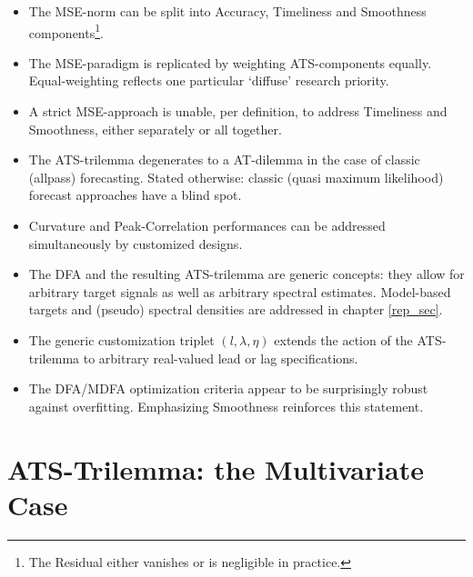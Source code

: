 \documentclass[a4paper]{book}
\begin{document}
\begin{itemize}
\item The MSE-norm can be split into Accuracy, Timeliness and Smoothness components\footnote{The Residual either vanishes or is negligible in practice.}. 
\item The MSE-paradigm is replicated by weighting ATS-components equally. Equal-weighting reflects one particular `diffuse' research priority.
\item A strict MSE-approach is unable, per definition, to address Timeliness and Smoothness, either separately or all together.
\item The ATS-trilemma degenerates to a AT-dilemma in the case of classic (allpass) forecasting. Stated otherwise: classic (quasi maximum likelihood) forecast approaches have a blind spot. 
\item Curvature and  Peak-Correlation performances can be addressed simultaneously by customized designs. 
\item The DFA and the resulting ATS-trilemma are generic concepts: they allow for arbitrary target signals as well as arbitrary spectral estimates. Model-based targets and (pseudo) spectral densities are addressed in chapter \ref{rep_sec}.
\item The generic customization triplet $(l,\lambda,\eta)$ extends the action of the ATS-trilemma to arbitrary real-valued lead or lag specifications. 
\item The DFA/MDFA optimization criteria appear to be surprisingly robust against overfitting. Emphasizing Smoothness reinforces this statement.
\end{itemize}





\chapter{ATS-Trilemma: the Multivariate Case}\label{atsm_sec}
\end{document}
